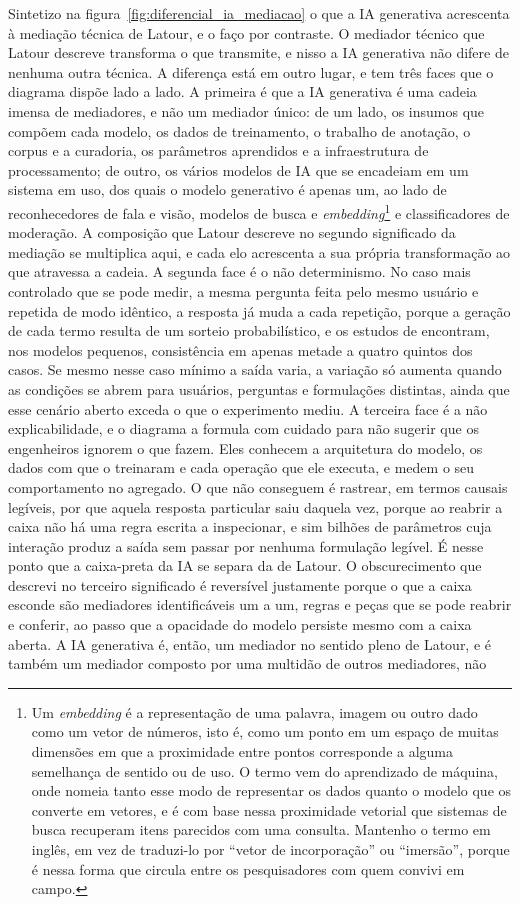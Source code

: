 Sintetizo na figura~\ref{fig:diferencial_ia_mediacao} o que a IA generativa acrescenta à mediação técnica de Latour, e o faço por contraste. O mediador técnico que Latour descreve transforma o que transmite, e nisso a IA generativa não difere de nenhuma outra técnica. A diferença está em outro lugar, e tem três faces que o diagrama dispõe lado a lado. A primeira é que a IA generativa é uma cadeia imensa de mediadores, e não um mediador único: de um lado, os insumos que compõem cada modelo, os dados de treinamento, o trabalho de anotação, o corpus e a curadoria, os parâmetros aprendidos e a infraestrutura de processamento; de outro, os vários modelos de IA que se encadeiam em um sistema em uso, dos quais o modelo generativo é apenas um, ao lado de reconhecedores de fala e visão, modelos de busca e \emph{embedding}\footnote{Um \emph{embedding} é a representação de uma palavra, imagem ou outro dado como um vetor de números, isto é, como um ponto em um espaço de muitas dimensões em que a proximidade entre pontos corresponde a alguma semelhança de sentido ou de uso. O termo vem do aprendizado de máquina, onde nomeia tanto esse modo de representar os dados quanto o modelo que os converte em vetores, e é com base nessa proximidade vetorial que sistemas de busca recuperam itens parecidos com uma consulta. Mantenho o termo em inglês, em vez de traduzi-lo por \enquote{vetor de incorporação} ou \enquote{imersão}, porque é nessa forma que circula entre os pesquisadores com quem convivi em campo.} e classificadores de moderação. A composição que Latour descreve no segundo significado da mediação se multiplica aqui, e cada elo acrescenta a sua própria transformação ao que atravessa a cadeia. A segunda face é o não determinismo. No caso mais controlado que se pode medir, a mesma pergunta feita pelo mesmo usuário e repetida de modo idêntico, a resposta já muda a cada repetição, porque a geração de cada termo resulta de um sorteio probabilístico, e os estudos de \textcite{Pinhanez2025Small} encontram, nos modelos pequenos, consistência em apenas metade a quatro quintos dos casos. Se mesmo nesse caso mínimo a saída varia, a variação só aumenta quando as condições se abrem para usuários, perguntas e formulações distintas, ainda que esse cenário aberto exceda o que o experimento mediu. A terceira face é a não explicabilidade, e o diagrama a formula com cuidado para não sugerir que os engenheiros ignorem o que fazem. Eles conhecem a arquitetura do modelo, os dados com que o treinaram e cada operação que ele executa, e medem o seu comportamento no agregado. O que não conseguem é rastrear, em termos causais legíveis, por que aquela resposta particular saiu daquela vez, porque ao reabrir a caixa não há uma regra escrita a inspecionar, e sim bilhões de parâmetros cuja interação produz a saída sem passar por nenhuma formulação legível. É nesse ponto que a caixa-preta da IA se separa da de Latour. O obscurecimento que descrevi no terceiro significado é reversível justamente porque o que a caixa esconde são mediadores identificáveis um a um, regras e peças que se pode reabrir e conferir, ao passo que a opacidade do modelo persiste mesmo com a caixa aberta. A IA generativa é, então, um mediador no sentido pleno de Latour, e é também um mediador composto por uma multidão de outros mediadores, não 